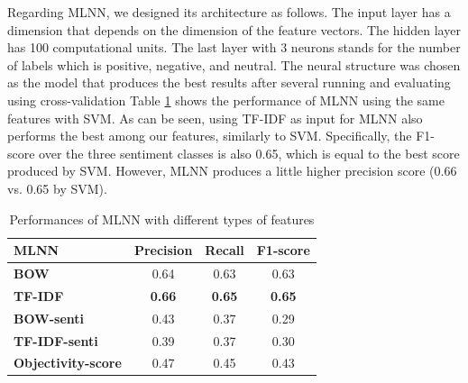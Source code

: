 \documentclass[conference,compsoc]{IEEEtran}
\begin{document}
Regarding MLNN, we designed its architecture as follows. The input layer has a dimension that depends on the dimension of the feature vectors. The hidden layer has 100 computational units. The last layer with 3 neurons stands for the number of labels which is positive, negative, and neutral. The neural structure was chosen as the model that produces the best results after several running and evaluating using cross-validation
Table \ref{tb-NN} shows the performance of MLNN using the same features with SVM. As can be seen, using TF-IDF as input for MLNN also performs the best among our features, similarly to SVM. Specifically, the F1-score over the three sentiment classes is also 0.65, which is equal to the best score produced by SVM. However, MLNN produces a little higher precision score (0.66 vs. 0.65 by SVM). 


\begin{table}[t]
\centering
\caption{Performances of MLNN with different types of features}
\label{tb-NN}
\begin{tabular}{|l|c|c|c|}
\hline
\textbf{MLNN}             & \textbf{Precision} & \textbf{Recall} & \textbf{F1-score} \\ \hline
\textbf{BOW}             & 0.64               & 0.63            & 0.63              \\
\textbf{TF-IDF}          & \textbf{0.66}      & \textbf{0.65}   & \textbf{0.65}     \\
\textbf{BOW-senti}       & 0.43               & 0.37            & 0.29              \\
\textbf{TF-IDF-senti}    & 0.39               & 0.37            & 0.30              \\
\textbf{Objectivity-score} & 0.47               & 0.45            & 0.43              \\ \hline
\end{tabular}
\end{table}
\end{document}
